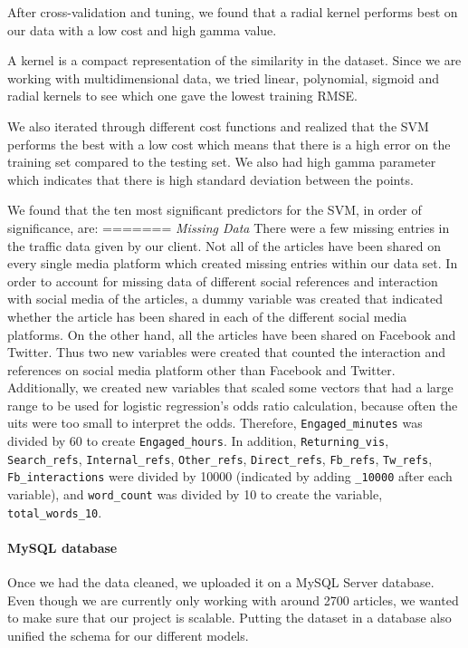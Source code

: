 \documentclass[10pt,letterpaper]{article}
\begin{document}
After cross-validation and tuning, we found that a radial kernel
performs best on our data with a low cost and high gamma value.

A kernel is a compact representation of the similarity in the dataset.
Since we are working with multidimensional data, we tried linear,
polynomial, sigmoid and radial kernels to see which one gave the lowest
training RMSE.

We also iterated through different cost functions and realized that the
SVM performs the best with a low cost which means that there is a high
error on the training set compared to the testing set. We also had high
gamma parameter which indicates that there is high standard deviation
between the points.

We found that the ten most significant predictors for the SVM, in order
of significance, are:
=======
\emph{Missing Data} There were a few missing entries in the traffic data
given by our client. Not all of the articles have been shared on every
single media platform which created missing entries within our data set.
In order to account for missing data of different social references and
interaction with social media of the articles, a dummy variable was
created that indicated whether the article has been shared in each of
the different social media platforms. On the other hand, all the
articles have been shared on Facebook and Twitter. Thus two new
variables were created that counted the interaction and references on
social media platform other than Facebook and Twitter. Additionally, we
created new variables that scaled some vectors that had a large range to
be used for logistic regression's odds ratio calculation, because often
the uits were too small to interpret the odds. Therefore,
\texttt{Engaged\_minutes} was divided by 60 to create
\texttt{Engaged\_hours}. In addition, \texttt{Returning\_vis},
\texttt{Search\_refs}, \texttt{Internal\_refs}, \texttt{Other\_refs},
\texttt{Direct\_refs}, \texttt{Fb\_refs}, \texttt{Tw\_refs},
\texttt{Fb\_interactions} were divided by 10000 (indicated by adding
\texttt{\_10000} after each variable), and \texttt{word\_count} was
divided by 10 to create the variable, \texttt{total\_words\_10}.

\hypertarget{mysql-database}{%
\paragraph{MySQL database}\label{mysql-database}}

Once we had the data cleaned, we uploaded it on a MySQL Server database.
Even though we are currently only working with around 2700 articles, we
wanted to make sure that our project is scalable. Putting the dataset in
a database also unified the schema for our different models.
\end{document}
